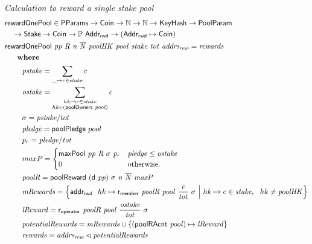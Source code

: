 \begin{figure}[htb]
  \emph{Calculation to reward a single stake pool}
  \begin{align*}
    & \mathsf{rewardOnePool} \in \mathsf{PParams} \to \mathsf{Coin} \to \mathbb{N} \to \mathbb{N} \to \mathsf{KeyHash} \to \mathsf{PoolParam}\\
      & ~~~\to \mathsf{Stake} \to \mathsf{Coin} \to \mathbb{P}~\mathsf{Addr_{rwd}}
           \to (\mathsf{Addr_{rwd}} \mapsto \mathsf{Coin}) \\
      & \mathsf{rewardOnePool} ~\mathit{pp}~\mathit{R}~\mathit{n}~\mathit{\overline{N}}~\mathit{poolHK}~\mathit{pool}~\mathit{stake}~\mathit{tot}~\mathit{addrs_{rew}} =
          \mathit{rewards}\\
      & ~~~~ ~ \mathbf{where}~ ~  \\
      & ~~~~~~~\mathit{pstake} = \sum_{\_\mapsto c\in\mathit{stake}} c \\
      & ~~~~~~~\mathit{ostake} = \sum_{\substack{
        hk_\mapsto c\in\mathit{stake}\\
        hk\in(\mathsf{poolOwners}~\mathit{pool})\\
        }} c \\
      & ~~~~~~~\sigma = \mathit{pstake} / tot \\
      & ~~~~~~~\mathit{pledge} = \mathsf{poolPledge}~pool \\
      & ~~~~~~~p_{r} = \mathit{pledge} / \mathit{tot} \\
      & ~~~~~~~maxP =
      \begin{cases}
        \mathsf{maxPool}~\mathit{pp}~\mathit{R}~\sigma~\mathit{p_r}&
        \mathit{pledge} \leq \mathit{ostake}\\
        0 & \text{otherwise.}
      \end{cases} \\
      & ~~~~~~~\mathit{poolR} = \mathsf{poolReward}~\mathit{(\mathsf{d}~pp)}~{\sigma}~\mathit{n}~\mathit{\overline{N}}~\mathit{maxP} \\
      & ~~~~~~~\mathit{mRewards} = \left\{
                                  \mathsf{addr_{rwd}}~ \mathit{~}hk\mapsto\mathsf{r_{member}}~ \mathit{poolR}~ \mathit{pool}~ \mathit{\frac{c}{tot}}~ {\sigma}
                                  ~\Big\vert~
                                  hk\mapsto c\in\mathit{stake},~~hk \neq\mathit{poolHK}
                               \right\}\\
      & ~~~~~~~\mathit{lReward} = \mathsf{r_{operator}}~ \mathit{poolR}~ \mathit{pool}~ \mathit{\frac{\mathit{ostake}}{tot}}~ {\sigma} \\
      & ~~~~~~~\mathit{potentialRewards} =
                 \mathit{mRewards} \cup
                 \{(\mathsf{poolRAcnt}~\mathit{pool})\mapsto\mathit{lReward}\} \\
      & ~~~~~~~\mathit{rewards} = \mathit{addrs_{rew}}\lhd{\ensuremath{\mathit{potentialRewards}}} \\
  \end{align*}


\end{figure}
